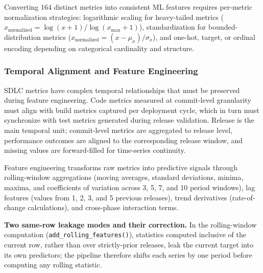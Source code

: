 \documentclass[technologies,article,submit,pdftex,moreauthors]{Definitions/mdpi}
\begin{document}
Converting 164 distinct metrics into consistent ML features requires per-metric normalization strategies: logarithmic scaling for heavy-tailed metrics (\(x_{\text{normalized}} = \log(x+1)/\log(x_{\max}+1)\)), standardization for bounded-distribution metrics (\(x_{\text{normalized}} = (x-\mu_x)/\sigma_x\)), and one-hot, target, or ordinal encoding depending on categorical cardinality and structure.

\subsubsection{Temporal Alignment and Feature Engineering}\label{sec:temporal_alignment}

SDLC metrics have complex temporal relationships that must be preserved during feature engineering. Code metrics measured at commit-level granularity must align with build metrics captured per deployment cycle, which in turn must synchronize with test metrics generated during release validation. Release is the main temporal unit; commit-level metrics are aggregated to release level, performance outcomes are aligned to the corresponding release window, and missing values are forward-filled for time-series continuity.

Feature engineering transforms raw metrics into predictive signals through rolling-window aggregations (moving averages, standard deviations, minima, maxima, and coefficients of variation across 3, 5, 7, and 10 period windows), lag features (values from 1, 2, 3, and 5 previous releases), trend derivatives (rate-of-change calculations), and cross-phase interaction terms.

\textbf{Two same-row leakage modes and their correction.} In the rolling-window computation (\texttt{add\_rolling\_features()}), statistics computed inclusive of the current row, rather than over strictly-prior releases, leak the current target into its own predictors; the pipeline therefore shifts each series by one period before computing any rolling statistic.
\end{document}
